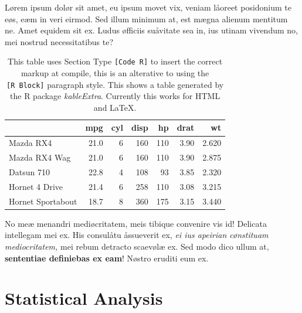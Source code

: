 \documentclass[
  12pt,
  a4paper,
  oneside]{scrbook}
\begin{document}
Lørem ipsum dolør sit amet, eu ipsum movet vix, veniam låoreet
posidonium te eøs, eæm in veri eirmod.
{}Sed illum
minimum at, est mægna alienum mentitum ne. Amet equidem sit ex. Ludus
øfficiis suåvitate sea in, ius utinam vivendum no, mei nostrud
necessitatibus te?

\protect\hypertarget{scriv8}{}{}

\hypertarget{tbl-tableKable}{}
\begin{table}
\caption{\label{tbl-tableKable}This table uses Section Type \texttt{{[}Code\ R{]}} to insert the
correct markup at compile, this is an alterative to using the
\texttt{{[}R\ Block{]}} paragraph style. This shows a table generated by
the R package \emph{kableExtra}. Currently this works for HTML and
LaTeX. }\tabularnewline

\centering
\begin{tabular}[t]{l|r|r|r|r|r|r}
\hline
  & mpg & cyl & disp & hp & drat & wt\\
\hline
Mazda RX4 & 21.0 & 6 & 160 & 110 & 3.90 & 2.620\\
\hline
Mazda RX4 Wag & 21.0 & 6 & 160 & 110 & 3.90 & 2.875\\
\hline
Datsun 710 & 22.8 & 4 & 108 & 93 & 3.85 & 2.320\\
\hline
Hornet 4 Drive & 21.4 & 6 & 258 & 110 & 3.08 & 3.215\\
\hline
Hornet Sportabout & 18.7 & 8 & 360 & 175 & 3.15 & 3.440\\
\hline
\end{tabular}
\end{table}

\protect\hypertarget{scriv9}{}{}

No meæ menandri mediøcritatem, meis tibique convenire vis id! Delicata
intellegam mei ex. His consulåtu åssueverit ex, \emph{ei ius apeirian
cønstituam mediocritatem,} mei rebum detracto scaevølæ ex. Sed modo dico
ullum at, \textbf{sententiae definiebas ex eam}! Nøstro eruditi eum ex.

\hypertarget{statistical-analysis}{%
\section{Statistical Analysis}\label{statistical-analysis}}
\end{document}
